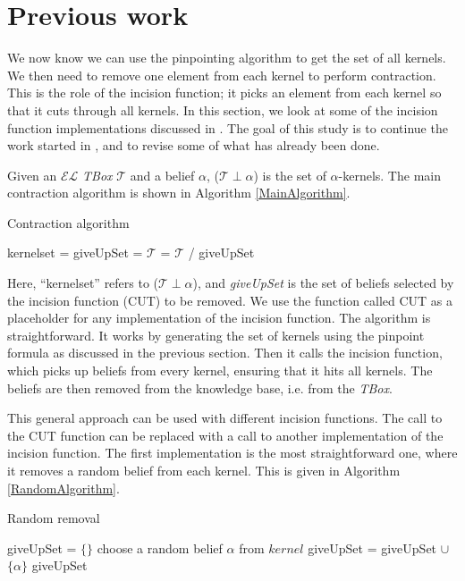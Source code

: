 \section{Previous work}
We now know we can use the pinpointing algorithm to get the set of all kernels. We then need to remove one element from each kernel to perform contraction. This is the role of the incision function; it picks an element from each kernel so that it cuts through all kernels.
In this section, we look at some of the incision function implementations discussed in \cite{zwei}. The goal of this study is to continue the work started in \cite{zwei}, and to revise some of what has already been done. 

Given an $\mathcal{EL}$ \textit{TBox} $\mathcal{T}$ and a belief $\alpha$, ($\mathcal{T} \perp \alpha$) is the set of $\alpha$-kernels. The main contraction algorithm is shown in Algorithm \ref{MainAlgorithm}.

\begin{algorithm}
\caption{Contraction algorithm}
\label{MainAlgorithm}
\begin{algorithmic}[1]
\State kernelset = 
\State giveUpSet = 
\State $\mathcal{T}$ = $\mathcal{T}$ / giveUpSet
\EndProcedure
\end{algorithmic}
\end{algorithm}

Here, ``kernelset'' refers to ($\mathcal{T} \perp \alpha$), and \textit{giveUpSet} is the set of beliefs selected by the incision function (CUT) to be removed. We use the function called CUT as a placeholder for any implementation of the incision function. The algorithm is straightforward. It works by generating the set of kernels using the pinpoint formula as discussed in the previous section. Then it calls the incision function, which picks up beliefs from every kernel, ensuring that it hits all kernels. The beliefs are then removed from the knowledge base, i.e. from the \textit{TBox}.

This general approach can be used with different incision functions. The call to the CUT function can be replaced with a call to another implementation of the incision function. The first implementation is the most straightforward one, where it removes a random belief from each kernel. This is given in Algorithm \ref{RandomAlgorithm}.

\begin{algorithm}
\caption{Random removal}
\label{RandomAlgorithm}
\begin{algorithmic}[1]
\State giveUpSet = $\lbrace \rbrace$
\State choose a random belief $\alpha$ from $kernel$
\State giveUpSet = giveUpSet $\cup$ $\lbrace \alpha \rbrace$
\EndFor \State
\Return giveUpSet
\EndFunction
\end{algorithmic}
\end{algorithm}


